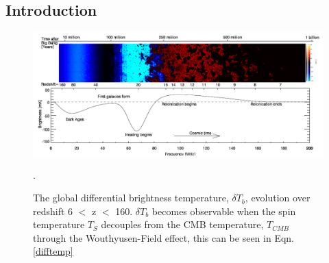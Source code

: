 \documentclass[a0,landscape]{a0poster}
\begin{document}
\begin{multicols}{4}
\begin{abstract}

\end{abstract}


\color{SaddleBrown} %

\section*{Introduction}

\begin{figure}[H]
\centering
\includegraphics[width=1.0\linewidth]{figures/global_history.png}
\caption{The global differential brightness temperature, $\delta T_b$, evolution over redshift 6 $<$ z $<$ 160. $\delta T_b$ becomes observable when 
the spin temperature $T_S$ decouples from the CMB temperature, $T_{CMB}$ through the Wouthyusen-Field effect, this can be seen in 
Eqn. \ref{difftemp}}.
\end{figure}



\end{multicols}
\end{document}
